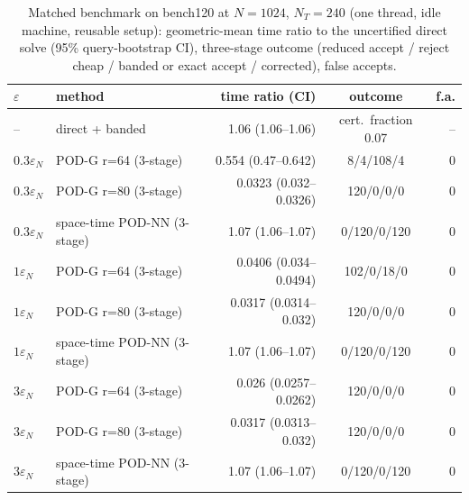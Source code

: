 \begin{table}[!htbp]
\centering\small
\caption{Matched benchmark on bench120 at $N=1024$, $N_T=240$ (one thread, idle machine, reusable setup): geometric-mean time ratio to the uncertified direct solve (95\% query-bootstrap CI), three-stage outcome (reduced accept / reject cheap / banded or exact accept / corrected), false accepts.}
\label{tab:benchmark}
\begin{tabular}{llrcr}
\toprule
$\varepsilon$ & method & time ratio (CI) & outcome & f.a.\\
\midrule
-- & direct + banded & 1.06 (1.06--1.06) & cert.\ fraction 0.07 & --\\
$0.3\varepsilon_N$ & POD-G r=64 (3-stage) & 0.554 (0.47--0.642) & 8/4/108/4 & 0\\
$0.3\varepsilon_N$ & POD-G r=80 (3-stage) & 0.0323 (0.032--0.0326) & 120/0/0/0 & 0\\
$0.3\varepsilon_N$ & space-time POD-NN (3-stage) & 1.07 (1.06--1.07) & 0/120/0/120 & 0\\
$1\varepsilon_N$ & POD-G r=64 (3-stage) & 0.0406 (0.034--0.0494) & 102/0/18/0 & 0\\
$1\varepsilon_N$ & POD-G r=80 (3-stage) & 0.0317 (0.0314--0.032) & 120/0/0/0 & 0\\
$1\varepsilon_N$ & space-time POD-NN (3-stage) & 1.07 (1.06--1.07) & 0/120/0/120 & 0\\
$3\varepsilon_N$ & POD-G r=64 (3-stage) & 0.026 (0.0257--0.0262) & 120/0/0/0 & 0\\
$3\varepsilon_N$ & POD-G r=80 (3-stage) & 0.0317 (0.0313--0.032) & 120/0/0/0 & 0\\
$3\varepsilon_N$ & space-time POD-NN (3-stage) & 1.07 (1.06--1.07) & 0/120/0/120 & 0\\
\bottomrule
\end{tabular}
\end{table}
